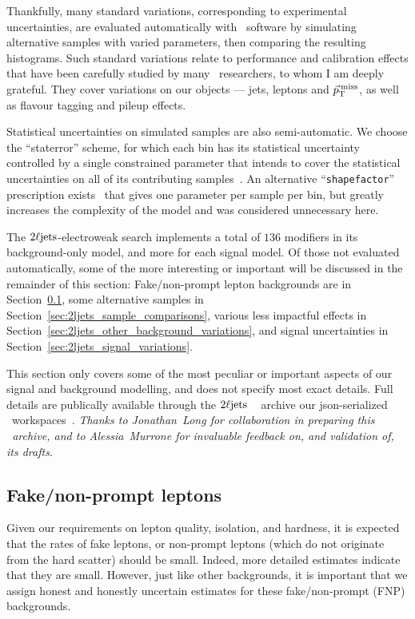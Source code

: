 Thankfully, many standard variations, corresponding to experimental
uncertainties, are evaluated automatically with \atlas\ software by simulating
alternative samples with varied parameters, then comparing the resulting
histograms.
Such standard variations relate to performance and calibration effects that
have been carefully studied by many \atlas\ researchers, to whom I am deeply
grateful.
They cover variations on our objects --- jets, leptons and $\vec p_\mathrm{T}^\mathrm{\:miss}$, as well
as flavour tagging and pileup effects.

Statistical uncertainties on simulated samples are also semi-automatic.
We choose the ``staterror'' scheme, for which each bin has its statistical
uncertainty controlled by a single constrained parameter that intends to cover
the statistical uncertainties on all of its contributing
samples~\cite{cranmer2012histfactory}.
An alternative ``\texttt{shapefactor}'' prescription
exists~\cite{cranmer2012histfactory} that gives one parameter
per sample per bin, but greatly increases the complexity of the model and
was considered unnecessary here.

The $2\ell\mathrm{jets}$-electroweak search implements a total of $136$ modifiers in its
background-only model, and more for each signal model.
Of those not evaluated automatically, some of the more interesting or important
will be discussed in the remainder of this section:
Fake/non-prompt lepton backgrounds are in Section~\ref{sec:2ljets_mm_fakes},
some alternative samples in Section~\ref{sec:2ljets_sample_comparisons},
various less impactful effects in
Section~\ref{sec:2ljets_other_background_variations},
and signal uncertainties in
Section~\ref{sec:2ljets_signal_variations}.

This section only covers some of the most peculiar or important aspects
of our signal and background modelling, and does not specify most exact
details.
Full details are publically available through the $2\ell\mathrm{jets}$
\hepdata~\cite{hepdata.116034, Maguire_2017} archive our json-serialized \pyhf\
workspaces~\cite{cranmer2012histfactory, heinrich2021pyhf}.
\emph{Thanks to Jonathan~Long for collaboration in preparing this \hepdata\ archive,
and to Alessia~Murrone for invaluable feedback on, and validation of, its
drafts.}


\subsection{Fake/non-prompt leptons}
\label{sec:2ljets_mm_fakes}
Given our requirements on lepton quality, isolation, and hardness, it is
expected that the rates of fake leptons, or non-prompt leptons (which do not
originate from the hard scatter) should be small.
Indeed, more detailed estimates indicate that they are small.
However, just like other backgrounds, it is important that we assign
honest and honestly uncertain estimates for these fake/non-prompt (FNP)
backgrounds.

